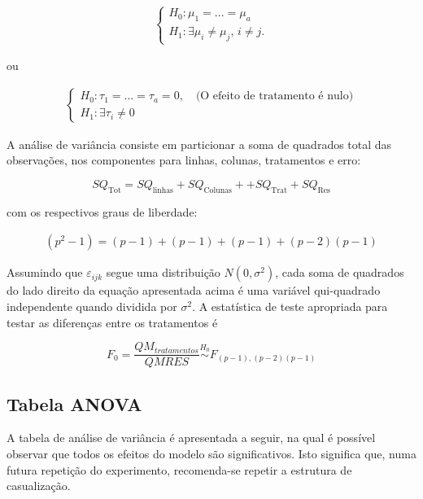\documentclass[
]{article}
\begin{document}
\begin{align}
  \begin{cases}
    H_0: \mu_1 = ... = \mu_a\\
    H_1: \exists \mu_i \neq \mu_j, \, i \neq j.
  \end{cases}
\end{align}

ou

\begin{align}
  \begin{cases}
    H_0: \tau_1 = ... = \tau_a = 0, \quad \text{(O efeito de tratamento é nulo)}\\
    H_1: \exists \tau_i \neq 0
  \end{cases}
\end{align}

A análise de variância consiste em particionar a soma de quadrados total
das observações, nos componentes para linhas, colunas, tratamentos e
erro:

\begin{equation}
 SQ_\text{Tot} = SQ_\text{{linhas}} + SQ_\text{{Colunas}} + + SQ_\text{{Trat}} + SQ_\text{Res}
\end{equation}

\noindent com os respectivos graus de liberdade:

\begin{align}
    (p^2-1) = (p-1) + (p-1) + (p-1) + (p-2)(p-1)
 \end{align}

Assumindo que \(\varepsilon_{ijk}\) segue uma distribuição
\(N(0,\sigma^2)\), cada soma de quadrados do lado direito da equação
apresentada acima é uma variável qui-quadrado independente quando
dividida por \(\sigma^2\). A estatística de teste apropriada para testar
as diferenças entre os tratamentos é

\begin{equation}
    F_0 = \frac{QM_{tratamentos}}{QMRES} \overset{H_0}{\sim} F_{(p-1),(p-2)(p-1)}
\end{equation}

\hypertarget{tabela-anova}{%
\subsection{Tabela ANOVA}\label{tabela-anova}}

A tabela de análise de variância é apresentada a seguir, na qual é
possível observar que todos os efeitos do modelo são significativos.
Isto significa que, numa futura repetição do experimento, recomenda-se
repetir a estrutura de casualização.
\end{document}
